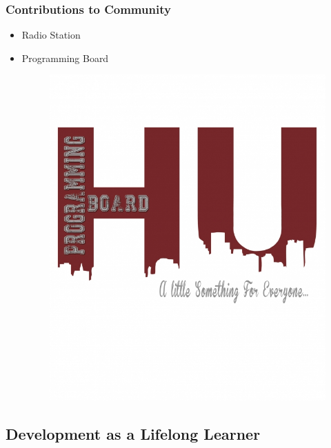 \documentclass{beamer}
\begin{document}
\begin{frame}
\frametitle{Contributions to Community}

\begin{itemize}
	\item Radio Station
	\begin{figure}[htp]
		\centering
		\quad
	\end{figure}
	\item Programming Board
	\begin{figure}[htp]
		\includegraphics[width=0.3\linewidth]{images/HUPB.jpg}
	\end{figure}
\end{itemize}

\end{frame}


\subsection{Development as a Lifelong Learner}
\end{document}
